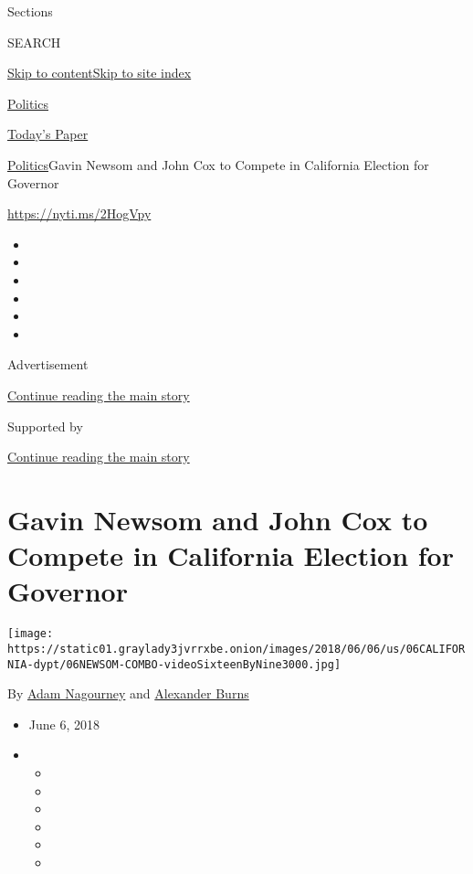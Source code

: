 Sections

SEARCH

\protect\hyperlink{site-content}{Skip to
content}\protect\hyperlink{site-index}{Skip to site index}

\href{https://www.nytimes3xbfgragh.onion/section/politics}{Politics}

\href{https://myaccount.nytimes3xbfgragh.onion/auth/login?response_type=cookie\&client_id=vi}{}

\href{https://www.nytimes3xbfgragh.onion/section/todayspaper}{Today's
Paper}

\href{/section/politics}{Politics}\textbar{}Gavin Newsom and John Cox to
Compete in California Election for Governor

\url{https://nyti.ms/2HogVpy}

\begin{itemize}
\item
\item
\item
\item
\item
\item
\end{itemize}

Advertisement

\protect\hyperlink{after-top}{Continue reading the main story}

Supported by

\protect\hyperlink{after-sponsor}{Continue reading the main story}

\hypertarget{gavin-newsom-and-john-cox-to-compete-in-california-election-for-governor}{%
\section{Gavin Newsom and John Cox to Compete in California Election for
Governor}\label{gavin-newsom-and-john-cox-to-compete-in-california-election-for-governor}}

\texttt{[image: https://static01.graylady3jvrrxbe.onion/images/2018/06/06/us/06CALIFORNIA-dypt/06NEWSOM-COMBO-videoSixteenByNine3000.jpg]}

By \href{http://www.nytimes3xbfgragh.onion/by/adam-nagourney}{Adam
Nagourney} and
\href{http://www.nytimes3xbfgragh.onion/by/alexander-burns}{Alexander
Burns}

\begin{itemize}
\item
  June 6, 2018
\item
  \begin{itemize}
  \item
  \item
  \item
  \item
  \item
  \item
  \end{itemize}
\end{itemize}

